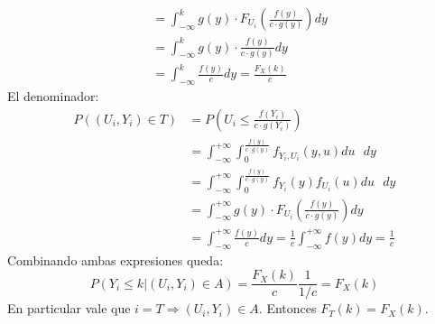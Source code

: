 \begin{enumerate}
\begin{align*}
									& = \int_{-\infty}^{k} g(y)\cdot F_{U_i}\left(\frac{f(y)}{c\cdot g(y)}\right) dy				\\
									& = \int_{-\infty}^{k} g(y)\cdot \frac{f(y)}{c\cdot g(y)} dy									\\
									& = \int_{-\infty}^{k} \frac{f(y)}{c} dy = \frac{F_X(k)}{c}
		\end{align*}
		El denominador:
		\begin{align*}
			P((U_i, Y_i) \in T)	& = P\left(U_i \leq \frac{f(Y_i)}{c\cdot g(Y_i)}\right)	\\
								& = \int_{-\infty}^{+\infty}\int_{0}^{\frac{f(y)}{c\cdot g(y)}} f_{Y_i,U_i}(y,u) du\text{ }dy		\\
								& = \int_{-\infty}^{+\infty}\int_{0}^{\frac{f(y)}{c\cdot g(y)}} f_{Y_i}(y)f_{U_i}(u) du\text{ }dy	\\
								& = \int_{-\infty}^{+\infty}g(y)\cdot F_{U_i}\left(\frac{f(y)}{c\cdot g(y)}\right) dy				\\
								& = \int_{-\infty}^{+\infty}\frac{f(y)}{c} dy = \frac{1}{c} \int_{-\infty}^{+\infty}f(y) dy	= \frac{1}{c}
		\end{align*}
		Combinando ambas expresiones queda:
		$$P(Y_i \leq k | (U_i, Y_i) \in A) = \frac{F_X(k)}{c} \frac{1}{1/c} = F_X(k)$$
		En particular vale que $i=T \Rightarrow (U_i, Y_i) \in A$.
		Entonces $F_T(k) = F_X(k)$.
\end{enumerate}

